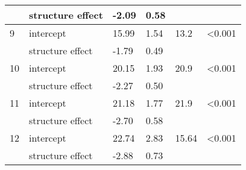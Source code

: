 \documentclass{article}
\begin{document}
\begin{table}[ht]
\begin{tabular}{|p{}|p{}p{}p{}p{}p{}|}
   & structure effect & -2.09 & 0.58 &  &  \\ 
   \hline
  9 & intercept & 15.99 & 1.54 & 13.2 & <0.001 \\ 
   & structure effect & -1.79 & 0.49 &  &  \\ 
   \hline
 10 & intercept & 20.15 & 1.93 & 20.9 & <0.001 \\ 
   & structure effect & -2.27 & 0.50 &  &  \\ 
   \hline
 11 & intercept & 21.18 & 1.77 & 21.9 & <0.001 \\ 
   & structure effect & -2.70 & 0.58 &  &  \\ 
   \hline
 12 & intercept & 22.74 & 2.83 & 15.64 & <0.001 \\ 
   & structure effect & -2.88 & 0.73 &  &  \\ 
   \hline
\end{tabular}
\endgroup
\end{table}    
\clearpage
\end{document}
